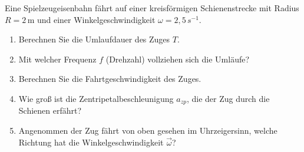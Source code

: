 \begin{ExerciseBlock}
Eine Spielzeugeisenbahn fährt auf einer kreisförmigen Schienenstrecke mit Radius $R = 2 \,$m und einer Winkelgeschwindigkeit $\omega = 2,5 \, s^{-1}$.

\begin{enumerate}
	\item Berechnen Sie die Umlaufdauer des Zuges $T$.

	\item Mit welcher Frequenz $f$ (Drehzahl) vollziehen sich die Umläufe?

	\item Berechnen Sie die Fahrtgeschwindigkeit des Zuges.

	\item Wie groß ist die Zentripetalbeschleunigung $a_{zp}$, die der Zug durch die Schienen erfährt?

	\item Angenommen der Zug fährt von oben gesehen im Uhrzeigersinn, welche Richtung hat die Winkelgeschwindigkeit $\vec{\omega}$?

\end{enumerate}
\end{ExerciseBlock}
